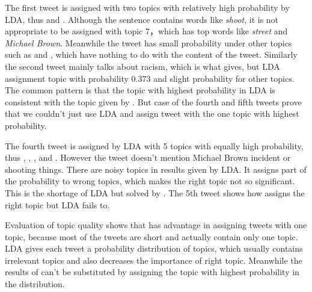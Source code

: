The first tweet is assigned with two topics with relatively high probability by LDA, thus \protest and \shootincident. Although the sentence contains words like \emph{shoot}, it is not appropriate to be assigned with topic 7，which has top words like \emph{street} and \emph{Michael Brown}. Meanwhile the tweet has small probability under other topics such as \obamatalk and \racism, which have nothing to do with the content of the tweet.
Similarly the second tweet mainly talks about racism, which is what \stlda gives, but LDA assignment topic \obamatalk with probability 0.373 and slight probability for other topics. The common pattern is that the topic with highest probability in LDA is consistent with the topic given by \stlda. But case of the fourth and fifth tweets prove that we couldn't just use LDA and assign tweet with the one topic with highest probability.

The fourth tweet is assigned by LDA with 5 topics with equally high probability, thus \protest, \michaelbrown, \shootincident, \emotion and \raceandcommunity. However the tweet doesn't mention Michael Brown incident or shooting things. There are noisy topics in results given by LDA. It assigns part of the probability to wrong topics, which makes the right topic not so significant. This is the shortage of LDA but solved by \stlda. The 5th tweet shows how \stlda assigns the right topic but LDA fails to.

Evaluation of topic quality shows that \stlda has advantage in assigning tweets with one topic, because most of the tweets are short and actually contain only one topic. LDA gives each tweet a probability distribution of topics, which usually contains irrelevant topics and also decreases the importance of right topic. Meanwhile the results of \stlda can't be substituted by assigning the topic with highest probability in the distribution.



